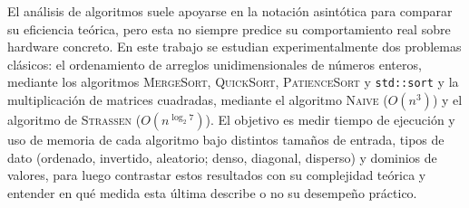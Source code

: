 El análisis de algoritmos suele apoyarse en la notación asintótica para
comparar su eficiencia teórica, pero esta no siempre predice su
comportamiento real sobre hardware concreto. En este trabajo se estudian
experimentalmente dos problemas clásicos: el ordenamiento de arreglos
unidimensionales de números enteros, mediante los algoritmos
\textsc{MergeSort}, \textsc{QuickSort}, \textsc{PatienceSort} y
\texttt{std::sort} y la multiplicación de matrices cuadradas,
mediante el algoritmo \textsc{Naive} ($O(n^3)$) y el algoritmo de
\textsc{Strassen} ($O(n^{\log_2 7})$). El objetivo es medir tiempo de
ejecución y uso de memoria de cada algoritmo bajo distintos tamaños de
entrada, tipos de dato (ordenado, invertido, aleatorio; denso, diagonal,
disperso) y dominios de valores, para luego contrastar estos resultados
con su complejidad teórica y entender en qué medida esta última describe
o no su desempeño práctico.